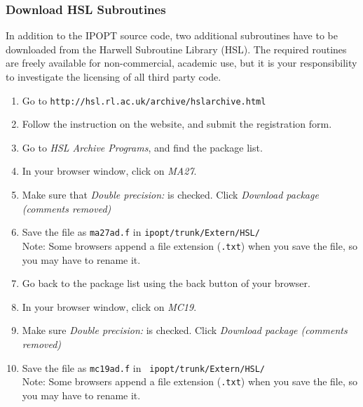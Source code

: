 \documentclass[letter,10pt]{article}
\begin{document}
\subsubsection{Download HSL Subroutines}
In addition to the IPOPT source code, two additional subroutines have
to be downloaded from the Harwell Subroutine Library (HSL).  The
required routines are freely available for non-commercial, academic
use, but it is your responsibility to investigate the licensing of all
third party code.
\begin{enumerate}
\item{Go to {\tt http://hsl.rl.ac.uk/archive/hslarchive.html}}
\item{Follow the instruction on the website, and submit the registration form.}
\item{Go to \textit{HSL Archive Programs}, and find the package list.}
\item{In your browser window, click on \textit{MA27}.}
\item{Make sure that \textit{Double precision:} is checked. 
Click \textit{Download package (comments removed)}}
\item{Save the file as {\tt ma27ad.f} in {\tt ipopt/trunk/Extern/HSL/}}\\
Note: Some browsers append a file extension ({\tt .txt}) when you save
the file, so you may have to rename it.
\item{Go back to the package list using the back button of your browser.}
\item{In your browser window, click on \textit{MC19}.}
\item{Make sure \textit{Double precision:} is checked. Click 
\textit{Download package (comments removed)}}
\item{Save the file as {\tt mc19ad.f} in {\tt
ipopt/trunk/Extern/HSL/}}\\
Note: Some browsers append a file extension ({\tt .txt}) when you save
the file, so you may have to rename it.
\end{enumerate}
\end{document}
